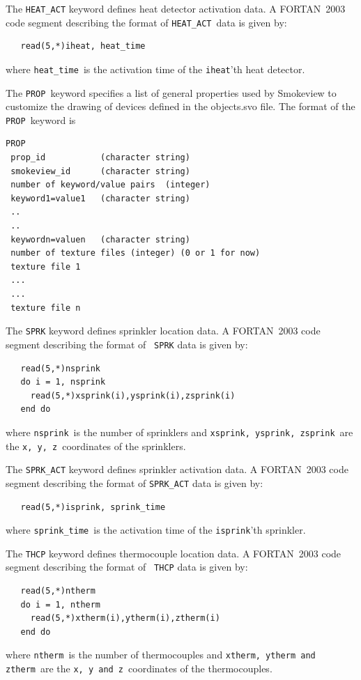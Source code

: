 \documentclass[11pt,twoside]{book}
\newcommand{\hitem}[1]{\item[{\bf #1} \hfill]}
\begin{document}
\hitem{HEAT\_ACT}The {\tt HEAT\_ACT} keyword defines heat detector
activation data. A FORTAN~2003 code segment describing the format
of {\tt HEAT\_ACT}\ data is given by:
\begin{lstlisting}
   read(5,*)iheat, heat_time
\end{lstlisting}
where {\tt heat\_time}\ is the activation time of the {\tt iheat}'th heat
detector.

\hitem{PROP}The {\tt PROP}\ keyword specifies
a list of general properties used
by Smokeview to customize the drawing of devices defined in
the objects.svo file.
The format of the {\tt PROP}\ keyword is

\begin{lstlisting}
PROP
 prop_id           (character string)
 smokeview_id      (character string)
 number of keyword/value pairs  (integer)
 keyword1=value1   (character string)
 ..
 ..
 keywordn=valuen   (character string)
 number of texture files (integer) (0 or 1 for now)
 texture file 1
 ...
 ...
 texture file n
\end{lstlisting}

\hitem{SPRK}The {\tt SPRK} keyword defines sprinkler location
data. A FORTAN~2003 code segment describing the format of {\tt
SPRK} data is given by:
\begin{lstlisting}
   read(5,*)nsprink
   do i = 1, nsprink
     read(5,*)xsprink(i),ysprink(i),zsprink(i)
   end do
\end{lstlisting}
where {\tt nsprink}\ is the number of sprinklers and
{\tt xsprink, ysprink, zsprink}\ are the {\tt x, y, z}\
coordinates of the sprinklers.

\hitem{SPRK\_ACT}The {\tt SPRK\_ACT} keyword defines sprinkler
activation data. A FORTAN~2003 code segment describing the format
of {\tt SPRK\_ACT} data is given by:
\begin{lstlisting}
   read(5,*)isprink, sprink_time
\end{lstlisting}
where {\tt sprink\_time}\ is the activation time of the {\tt isprink}'th sprinkler.

\hitem{THCP}The {\tt THCP} keyword defines thermocouple location
data. A FORTAN~2003 code segment describing the format of {\tt
THCP} data is given by:
\begin{lstlisting}
   read(5,*)ntherm
   do i = 1, ntherm
     read(5,*)xtherm(i),ytherm(i),ztherm(i)
   end do
\end{lstlisting}
where {\tt ntherm}\ is the number of thermocouples and
{\tt xtherm, ytherm and ztherm}\ are the {\tt x, y and z}\
coordinates of the thermocouples.
\end{document}
